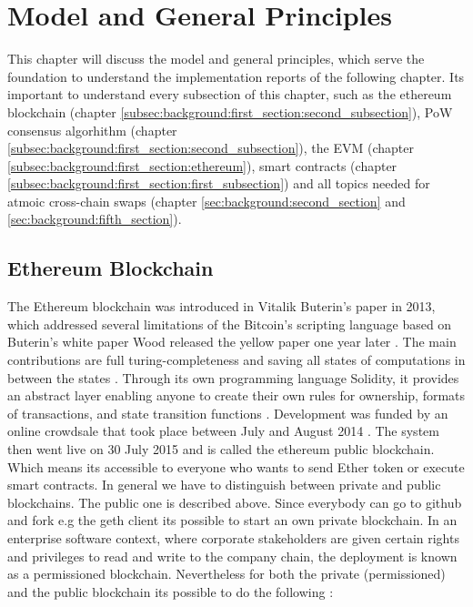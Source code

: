 \chapter{Model and General Principles}
\label{ch:background}

This chapter will discuss the model and general principles, which serve the foundation to understand the implementation reports of the following chapter. Its important to understand every subsection of this chapter, such as the ethereum blockchain (chapter \ref{subsec:background:first_section:second_subsection}), \ac{PoW} consensus algorhithm (chapter \ref{subsec:background:first_section:second_subsection}), the \ac{EVM} (chapter \ref{subsec:background:first_section:ethereum}), smart contracts (chapter \ref{subsec:background:first_section:first_subsection}) and all topics needed for atmoic cross-chain swaps (chapter \ref{sec:background:second_section} and \ref{sec:background:fifth_section}). 


%
%
\section{Ethereum Blockchain}
\label{sec:background:first_section}
The Ethereum blockchain was introduced in Vitalik Buterin’s paper in 2013, which addressed several limitations of the Bitcoin’s scripting language \cite{buterin2013ethereum} based on Buterin's white paper Wood released the yellow paper one year later \cite{wood2014ethereum}. The main contributions are full turing-completeness and saving all states of computations in between the states \cite{dannen2017introducing}. Through its own programming language Solidity, it provides an abstract layer enabling anyone to create their own rules for ownership, formats of transactions, and state transition functions \cite{vujivcic2018blockchain}. Development was funded by an online crowdsale that took place between July and August 2014 \cite{tapscott2016blockchain}. The system then went live on 30 July 2015 \cite{ethlaunches} and is called the ethereum public blockchain. Which means its accessible to everyone who wants to send Ether token or execute smart contracts. In general we have to distinguish between private and public blockchains. The public one is described above. Since everybody can go to github and fork e.g the geth client its possible to start an own private blockchain. In an enterprise software context, where corporate stakeholders are given certain rights and privileges to read and write to the company chain, the deployment is known as a permissioned blockchain. Nevertheless for both the private (permissioned) and the public blockchain its possible to do the following \cite{dannen2017introducing}:


